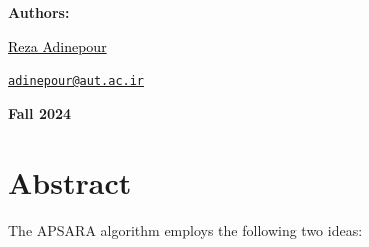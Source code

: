 \documentclass[12pt	]{article}
\begin{document}
\begin{flushleft}
    \textbf{\selectfont Authors:}
\end{flushleft}

\begin{center}
    \begin{minipage}{0.5\textwidth}
        \begin{flushleft}
            \href{https://rezaadinepour.github.io/}{\textcolor{black}{Reza Adinepour}}\\
        \end{flushleft}
    \end{minipage}%
    \begin{minipage}{0.5\textwidth}
        \begin{flushright}
            \href{mailto:adinepour@aut.ac.ir}{\texttt{adinepour@aut.ac.ir}}
        \end{flushright}
    \end{minipage}
\end{center}

\vspace{1em}

    
\begin{center}
    \bigskip \bigskip \bigskip \bigskip
    \large \bf {}\selectfont Fall 2024
\end{center}

\thispagestyle{empty}

\setcounter{page}{0}

\newpage

\tableofcontents

\newpage






\section{Abstract}
The APSARA algorithm \cite{giaccone2003randomized} employs the following two ideas:
\end{document}
